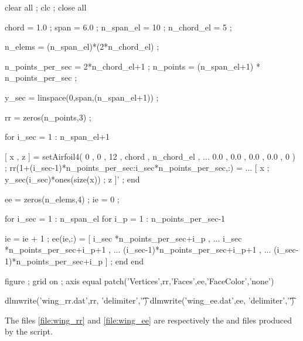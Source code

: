 \begin{inputfile}[frame=single, caption={\opt{wing.m}}, label={file:wing_m}]
%
clear all ; clc ; close all

chord      = 1.0 ;
span       = 6.0 ;
n_span_el  = 10  ;
n_chord_el = 5   ; %

n_elems = (n_span_el)*(2*n_chord_el) ;

n_points_per_sec = 2*n_chord_el+1 ;
n_points         = (n_span_el+1) * n_points_per_sec ;

y_sec = linspace(0,span,(n_span_el+1)) ;

rr = zeros(n_points,3) ;

for i_sec = 1 : n_span_el+1

  [ x , z ] = setAirfoil4( 0 , 0 , 12 , chord , n_chord_el , ...
                           0.0 , 0.0 , 0.0 , 0.0 , 0 ) ; 
  rr(1+(i_sec-1)*n_points_per_sec:i_sec*n_points_per_sec,:) = ...
                                 [ x ; y_sec(i_sec)*ones(size(x)) ; z ]' ;
end

ee = zeros(n_elems,4) ; ie = 0 ;

for i_sec = 1 : n_span_el
  for i_p = 1 : n_points_per_sec-1

    ie = ie + 1 ;
    ee(ie,:) = [ i_sec   *n_points_per_sec+i_p   , ...
                 i_sec   *n_points_per_sec+i_p+1 , ...
                (i_sec-1)*n_points_per_sec+i_p+1 , ...
                (i_sec-1)*n_points_per_sec+i_p   ] ;
  end
end

figure ; grid on ; axis equal
patch('Vertices',rr,'Faces',ee,'FaceColor','none')

dlmwrite('wing_rr.dat',rr, 'delimiter','\t')
dlmwrite('wing_ee.dat',ee, 'delimiter','\t')

\end{inputfile}
The files \ref{file:wing_rr} and \ref{file:wing_ee} are respectively the 
 and  files produced by the  script.

